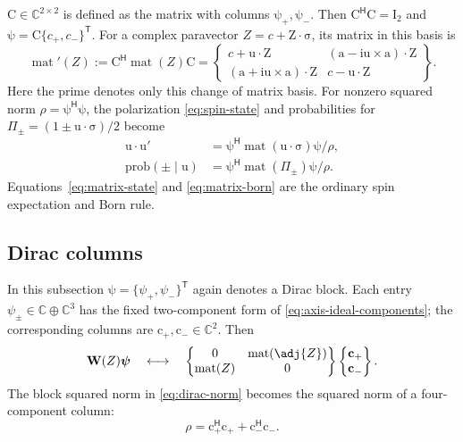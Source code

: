 \documentclass[11pt]{article}
\newcommand{\pv}[1]{{#1}}
\newcommand{\pvGreek}[1]{{#1}}
\newcommand{\vstyle}[1]{{\bm{\mathrm{#1}}}}
\newcommand{\pZ}{\pv{Z}}
\newcommand{\pvPi}{\pvGreek{\Pi}}
\newcommand{\pvpsi}{\pvGreek{\psi}}
\numberwithin{equation}{section}
\newcommand{\C}{\mathbb{C}}
\newcommand{\ii}{\mathrm{i}}
\newcommand{\dotprod}{\cdot}
\newcommand{\bsig}{\vstyle{\sigma}}
\newcommand{\bZ}{\vstyle{Z}}
\newcommand{\bu}{\vstyle{u}}
\newcommand{\ba}{\vstyle{a}}
\newcommand{\bI}{\vstyle{I}}
\newcommand{\bpsi}{\vstyle{\psi}}
\newcommand{\Wop}{\vstyle{W}}
\begin{document}
$\vstyle{C}\in\C^{2\times2}$ is defined as the matrix with columns
$\bpsi_+,\bpsi_-$.  Then $\vstyle{C}^{\mathsf H}\vstyle{C}=\bI_2$ and
$\bpsi=\vstyle{C}\{c_+,c_-\}^{\mathsf T}$.
For a complex paravector $\pZ=c+\bZ\dotprod\bsig$, its matrix in this basis is
\begin{equation}
 \operatorname{mat}'(\pZ):=\vstyle{C}^{\mathsf H}\operatorname{mat}(\pZ)\vstyle{C}
 =\begin{Bmatrix}
 c+\bu\dotprod\bZ&(\ba-\ii\bu\times\ba)\dotprod\bZ\\
 (\ba+\ii\bu\times\ba)\dotprod\bZ&c-\bu\dotprod\bZ
 \end{Bmatrix}.
 \label{eq:matrix-arbitrary-axis}
\end{equation}
Here the prime denotes only this change of matrix basis.
For nonzero squared norm $\rho=\bpsi^{\mathsf H}\bpsi$, the polarization
\eqref{eq:spin-state} and probabilities for
$\pvPi_\pm=(1\pm\bu\dotprod\bsig)/2$ become
\begin{align}
 \bu\dotprod\bu'&=\bpsi^{\mathsf H}\operatorname{mat}(\bu\dotprod\bsig)\bpsi/\rho,
 \label{eq:matrix-state}\\
 \mathrm{prob}(\pm\mid\bu)&=\bpsi^{\mathsf H}\operatorname{mat}(\pvPi_\pm)\bpsi/\rho.
 \label{eq:matrix-born}
\end{align}
Equations~\eqref{eq:matrix-state} and \eqref{eq:matrix-born} are the ordinary
spin expectation and Born rule.

\subsection{Dirac columns}
\label{sec:matrix-dirac-columns}

In this subsection $\bpsi=\{\pvpsi_+,\pvpsi_-\}^{\mathsf T}$ again denotes
a Dirac block. Each entry $\pvpsi_\pm\in\C\oplus\C^3$ has the fixed
two-component form of \eqref{eq:axis-ideal-components}; the corresponding
columns are $\vstyle{c}_+,\vstyle{c}_-\in\C^2$. Then
\[
 \Wop(\pZ)\bpsi\quad\longleftrightarrow\quad
 \begin{Bmatrix}0&\operatorname{mat}(\adj {\pZ})\\
 \operatorname{mat}(\pZ)&0\end{Bmatrix}
 \begin{Bmatrix}\vstyle{c}_+\\\vstyle{c}_-\end{Bmatrix}.
\]
The block squared norm in \eqref{eq:dirac-norm} becomes the squared norm
of a four-component column:
\begin{equation*}
 \rho=\vstyle{c}_+^{\mathsf H}\vstyle{c}_++\vstyle{c}_-^{\mathsf H}\vstyle{c}_-.
\end{equation*}
\end{document}

